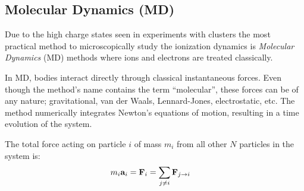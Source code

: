 
\subsection{Molecular Dynamics (MD)}
\label{section:tools:md}




Due to the high charge states seen in experiments with clusters the most
practical method to microscopically study the ionization dynamics is
\textit{Molecular Dynamics} (MD) methods where ions and electrons are treated
classically.

In MD, bodies interact directly through classical instantaneous forces. Even
though the method's name contains the term ``molecular'', these forces can be
of any nature; gravitational, van der Waals, Lennard-Jones, electrostatic, etc.
The method numerically integrates Newton's equations of motion, resulting in a
time evolution of the system.

The total force acting on particle $i$ of mass $m_i$ from all other $N$
particles in the system is:
\begin{align}
m_i \textbf{a}_i & = \textbf{F}_i = \sum_{j \ne i} \textbf{F}_{j \rightarrow i}
\label{eqn:md:newton}
\end{align}


